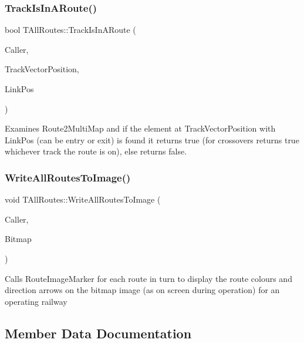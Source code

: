 \subsubsection{\texorpdfstring{Track\+Is\+In\+A\+Route()}{TrackIsInARoute()}}
{\footnotesize\ttfamily bool T\+All\+Routes\+::\+Track\+Is\+In\+A\+Route (\begin{DoxyParamCaption}\item[{int}]{Caller,  }\item[{int}]{Track\+Vector\+Position,  }\item[{int}]{Link\+Pos }\end{DoxyParamCaption})}

Examines Route2\+Multi\+Map and if the element at Track\+Vector\+Position with Link\+Pos (can be entry or exit) is found it returns true (for crossovers returns true whichever track the route is on), else returns false. \mbox{\label{class_t_all_routes_a7c9ca14ec6116983b505f0a451dd078f}} 
\subsubsection{\texorpdfstring{Write\+All\+Routes\+To\+Image()}{WriteAllRoutesToImage()}}
{\footnotesize\ttfamily void T\+All\+Routes\+::\+Write\+All\+Routes\+To\+Image (\begin{DoxyParamCaption}\item[{int}]{Caller,  }\item[{Graphics\+::\+T\+Bitmap $\ast$}]{Bitmap }\end{DoxyParamCaption})}

Calls Route\+Image\+Marker for each route in turn to display the route colours and direction arrows on the bitmap image (as on screen during operation) for an operating railway 

\subsection{Member Data Documentation}
\mbox{\label{class_t_all_routes_a961a443309f2ea74dc4c24b5a94fd8b6}} 
